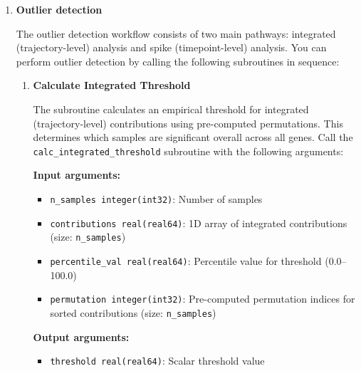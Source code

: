 \begin{enumerate}
\begin{enumerate}
            \item \textbf{Outlier detection}
                  
                  The outlier detection workflow consists of two main pathways:
                  integrated (trajectory-level) analysis and spike (timepoint-level)
                  analysis. You can perform outlier detection by calling the following subroutines
                  in sequence:
                  
                  \begin{enumerate}
                    \item \textbf{Calculate Integrated Threshold}
                          
                          The subroutine calculates an empirical threshold for integrated (trajectory-level)
                          contributions using pre-computed permutations. This determines
                          which samples are significant overall across all genes. Call the \texttt{calc\_integrated\_threshold}
                          subroutine with the following arguments:
                          
                          \textbf{Input arguments:}
                          \begin{itemize}
                            \item \texttt{n\_samples integer(int32)}: Number of samples
                                  
                            \item \texttt{contributions real(real64)}: 1D array of integrated
                                  contributions (size: \texttt{n\_samples})
                                  
                            \item \texttt{percentile\_val real(real64)}: Percentile value for
                                  threshold (0.0--100.0)
                                  
                            \item \texttt{permutation integer(int32)}: Pre-computed permutation
                                  indices for sorted contributions (size: \texttt{n\_samples})
                          \end{itemize}
                          \textbf{Output arguments:}
                          \begin{itemize}
                            \item \texttt{threshold real(real64)}: Scalar threshold value
                                  

\end{itemize}
\end{enumerate}
\end{enumerate}
\end{enumerate}
